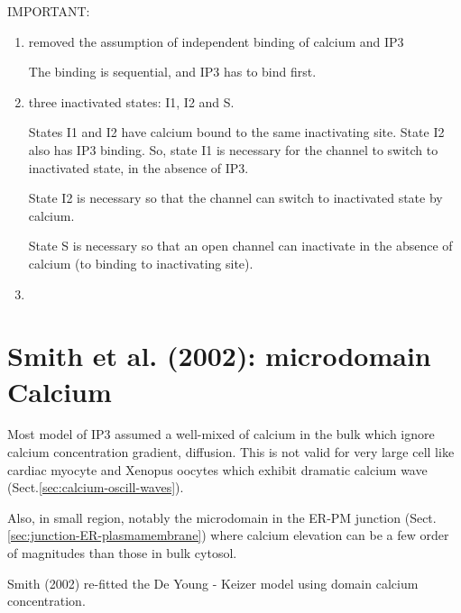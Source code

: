 IMPORTANT:
\begin{enumerate}
  \item  removed the assumption of independent binding of calcium and IP3

The binding is sequential, and IP3 has to bind first.
  
  \item three inactivated states: I1, I2 and S.

States I1 and I2 have calcium bound to the same inactivating site.  
State I2 also has IP3 binding. So, state I1 is necessary for the channel to
switch to inactivated state, in the absence of IP3.

State I2 is necessary so that the channel can switch to inactivated state by
calcium.

State S is necessary so that an open channel can inactivate in the absence of
calcium (to binding to inactivating site).

  \item  
\end{enumerate}


\section{Smith et al. (2002): microdomain Calcium}

Most model of IP3 assumed a well-mixed of calcium in the bulk which ignore
calcium concentration gradient, diffusion. This is not valid for very large cell
like cardiac myocyte and Xenopus oocytes which exhibit dramatic calcium wave
(Sect.\ref{sec:calcium-oscill-waves}).

Also, in small region, notably the microdomain in the ER-PM junction
(Sect.\ref{sec:junction-ER-plasmamembrane}) where calcium elevation can be a few
order of magnitudes than those in bulk cytosol. 

Smith (2002) re-fitted the De Young - Keizer model using domain calcium
concentration. 





